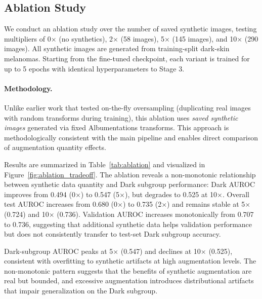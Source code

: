 \subsection{Ablation Study}

We conduct an ablation study over the number of saved synthetic images, testing multipliers of 0$\times$ (no synthetics), 2$\times$ (58 images), 5$\times$ (145 images), and 10$\times$ (290 images). All synthetic images are generated from training-split dark-skin melanomas. Starting from the fine-tuned checkpoint, each variant is trained for up to 5 epochs with identical hyperparameters to Stage 3.

\paragraph{Methodology.}
Unlike earlier work that tested on-the-fly oversampling (duplicating real images with random transforms during training), this ablation uses \emph{saved synthetic images} generated via fixed Albumentations transforms. This approach is methodologically consistent with the main pipeline and enables direct comparison of augmentation quantity effects.

Results are summarized in Table~\ref{tab:ablation} and visualized in Figure~\ref{fig:ablation_tradeoff}. The ablation reveals a non-monotonic relationship between synthetic data quantity and Dark subgroup performance: Dark AUROC improves from 0.494 (0$\times$) to 0.547 (5$\times$), but degrades to 0.525 at 10$\times$. Overall test AUROC increases from 0.680 (0$\times$) to 0.735 (2$\times$) and remains stable at 5$\times$ (0.724) and 10$\times$ (0.736). Validation AUROC increases monotonically from 0.707 to 0.736, suggesting that additional synthetic data helps validation performance but does not consistently transfer to test-set Dark subgroup accuracy.

Dark-subgroup AUROC peaks at 5$\times$ (0.547) and declines at 10$\times$ (0.525), consistent with overfitting to synthetic artifacts at high augmentation levels. The non-monotonic pattern suggests that the benefits of synthetic augmentation are real but bounded, and excessive augmentation introduces distributional artifacts that impair generalization on the Dark subgroup.
